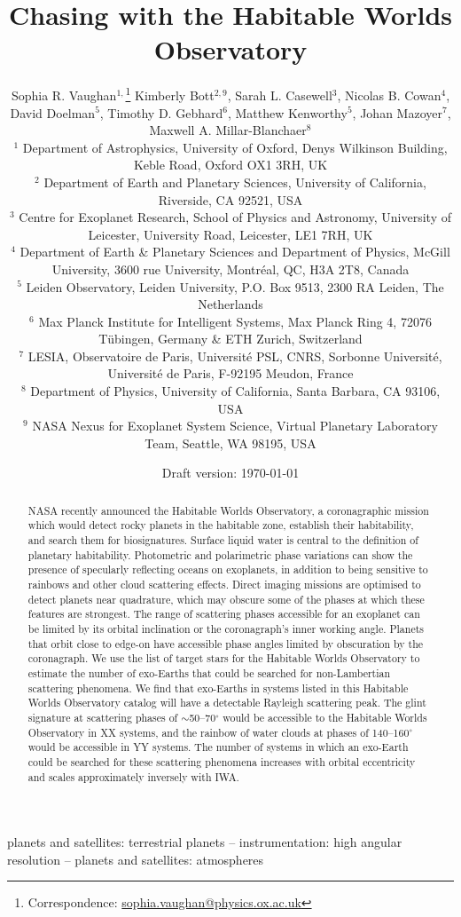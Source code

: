 \documentclass[
    usenatbib,
]{mnras}
\title{Chasing \rainbows{} with the Habitable Worlds Observatory}
\author[Sophia R. Vaughan et al.]{%
    Sophia R. Vaughan$^{1,}$\thanks{Correspondence:  \url{sophia.vaughan@physics.ox.ac.uk}}
    Kimberly Bott$^{2,9}$,
    Sarah L. Casewell$^{3}$,
    Nicolas B. Cowan$^{4}$,
    David Doelman$^{5}$,\newauthor
    Timothy D. Gebhard$^{6}$,
    Matthew Kenworthy$^{5}$,
    Johan Mazoyer$^{7}$,
    Maxwell A. Millar-Blanchaer$^{8}$
    \newauthor [remaining workshop participants in alphabetical order] \newauthor 
    \\
    $^{1}$ Department of Astrophysics, University of Oxford, Denys Wilkinson Building, Keble Road, Oxford OX1 3RH, UK\\
    $^{2}$ Department of Earth and Planetary Sciences, University of California, Riverside, CA 92521, USA \\
    $^{3}$ Centre for Exoplanet Research, School of Physics and Astronomy, University of Leicester, University Road, Leicester, LE1 7RH, UK\\
    $^{4}$ Department of Earth \& Planetary Sciences and Department of Physics, McGill University, 3600 rue University, Montréal, QC, H3A 2T8, Canada\\
    $^{5}$ Leiden Observatory, Leiden University, P.O. Box 9513, 2300 RA Leiden, The Netherlands\\
    $^{6}$ Max Planck Institute for Intelligent Systems, Max Planck Ring 4, 72076 Tübingen, Germany \& ETH Zurich, Switzerland \\
    $^{7}$ LESIA, Observatoire de Paris, Université PSL, CNRS, Sorbonne Université, Université de Paris, F-92195 Meudon, France \\
    $^{8}$ Department of Physics, University of California, Santa Barbara, CA 93106, USA \\
    $^{9}$ NASA Nexus for Exoplanet System Science, Virtual Planetary Laboratory Team, Seattle, WA 98195, USA
}
\date{Draft version: \today}
\begin{document}
 

\maketitle

\begin{abstract}
NASA recently announced the Habitable Worlds Observatory, a coronagraphic mission which would detect rocky planets in the habitable zone, establish their habitability, and search them for biosignatures. 
Surface liquid water is central to the definition of planetary habitability.
%
Photometric and polarimetric phase variations can show the presence of specularly reflecting oceans on exoplanets, in addition to being sensitive to rainbows and other cloud scattering effects. Direct imaging missions are optimised to detect planets near quadrature, which may obscure some of the phases at which these features are strongest. The range of scattering phases accessible for an exoplanet can be limited by its orbital inclination or the coronagraph's inner working angle. Planets that orbit close to edge-on have accessible phase angles limited by obscuration by the coronagraph. We use the list of target stars for the Habitable Worlds Observatory to estimate the number of exo-Earths that could be searched for non-Lambertian scattering phenomena. We find that exo-Earths in systems listed in this Habitable Worlds Observatory catalog will have a detectable Rayleigh scattering peak. The glint signature at scattering phases of $\sim$50--70$^\circ$ would be accessible to the Habitable Worlds Observatory in XX systems, and the rainbow of water clouds at phases of 140--160$^\circ$ would be accessible in YY systems. The number of systems in which an exo-Earth could be searched for these scattering phenomena increases with orbital eccentricity and scales approximately inversely with IWA.       


\end{abstract}

\begin{keywords}
planets and satellites: terrestrial planets -- instrumentation: high angular resolution -- planets and satellites: atmospheres
\end{keywords}
\end{document}
